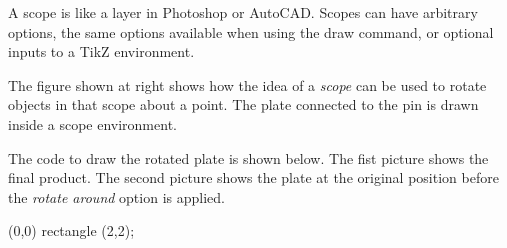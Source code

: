 \documentclass{../../ExampleProblem}
\begin{document}
\begin{paracol}{2}

A scope is like a layer in Photoshop or AutoCAD. Scopes can have arbitrary options, the same options available when using the draw command, or optional inputs to a TikZ environment.



The figure shown at right shows how the idea of a \textit{scope} can be used to rotate objects in that scope about a point. The plate connected to the pin is drawn inside a scope environment.

The code to draw the rotated plate is shown below. The fist picture shows the final product. The second picture shows the plate at the original position before the \textit{rotate around} option is applied.

\begin{latexcode}
\begin{scope}[rotate around={-135:(0,0)}]
\draw[ultra thick,fill=lightgray]
      (0,0) rectangle (2,2);
\end{scope}
\end{latexcode}

\switchcolumn

\centering
{}

\vspace{0.5cm}


\end{paracol}
\end{document}
